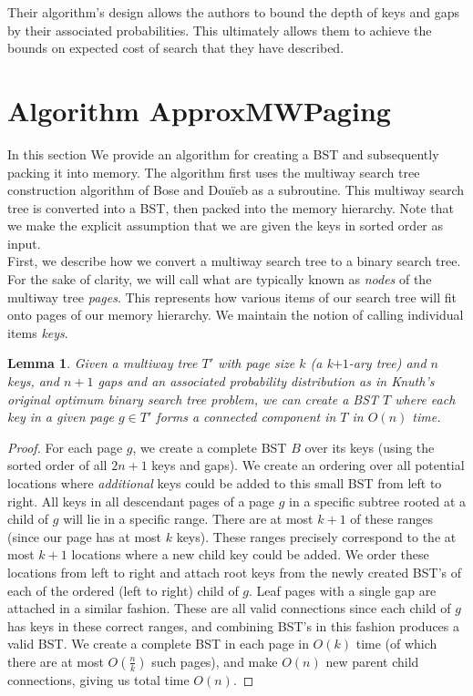 \documentclass[letterpaper,12pt,titlepage,oneside,final]{book}
\theoremstyle{plain}
\newtheorem{lem}[thm]{Lemma}
\begin{document}
 Their algorithm's design allows the authors to bound the depth of keys and gaps by their associated probabilities. This ultimately allows them to achieve the bounds on expected cost of search that they have described. 

\section{Algorithm ApproxMWPaging}\label{Algorithm ApproxMWPaging}

In this section We provide an algorithm for creating a BST and subsequently packing it into memory. The algorithm first uses the multiway search tree construction algorithm of Bose and Dou\"{i}eb as a subroutine. This multiway search tree is converted into a BST, then packed into the memory hierarchy. Note that we make the explicit assumption that we are given the keys in sorted order as input. \\

First, we describe how we convert a multiway search tree to a binary search tree. For the sake of clarity, we will call what are typically known as \textit{nodes} of the multiway tree \textit{pages}. This represents how various items of our search tree will fit onto pages of our memory hierarchy. We maintain the notion of calling individual items \textit{keys}.

\begin{lem}\label{MWTBSTLem}
Given a multiway tree $T'$ with page size $k$ (a k$+1$-ary tree) and $n$ keys, and $n+1$ gaps and an associated probability distribution as in Knuth's original optimum binary search tree problem, we can create a BST $T$ where each key in a given page $g \in T'$ forms a connected component in $T$ in $O(n)$ time.
\end{lem}

\begin{proof}
For each page $g$, we create a complete BST $B$ over its keys (using the sorted order of all $2n+1$ keys and gaps). We create an ordering over all potential locations where \textit{additional} keys could be added to this small BST from left to right. All keys in all descendant pages of a page $g$ in a specific subtree rooted at a child of $g$ will lie in a specific range. There are at most $k+1$ of these ranges (since our page has at most $k$ keys). These ranges precisely correspond to the at most $k+1$ locations where a new child key could be added. We order these locations from left to right and attach root keys from the newly created BST's of each of the ordered (left to right) child of $g$. Leaf pages with a single gap are attached in a similar fashion. These are all valid connections since each child of $g$ has keys in these correct ranges, and combining BST's in this fashion produces a valid BST. We create a complete BST in each page in $O(k)$ time (of which there are at most $O(\frac{n}{k})$ such pages), and make $O(n)$ new parent child connections, giving us total time $O(n)$.
\end{proof}
\end{document}
